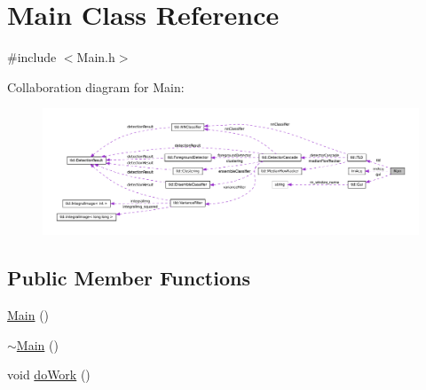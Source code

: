\hypertarget{class_main}{
\section{Main Class Reference}
\label{class_main}
}


{\ttfamily \#include $<$Main.h$>$}



Collaboration diagram for Main:
\nopagebreak
\begin{figure}[H]
\begin{center}
\leavevmode
\includegraphics[width=400pt]{class_main__coll__graph}
\end{center}
\end{figure}
\subsection*{Public Member Functions}
\begin{DoxyCompactItemize}
\item 
\hyperlink{class_main_a50d4361a1b613205467a441b5c40c199}{Main} ()
\item 
\hyperlink{class_main_a58d9c0798f0d2114e736d04d780a080f}{$\sim$Main} ()
\item 
void \hyperlink{class_main_a5effa58c6ae671f8ce4ff31cb6e07aa5}{doWork} ()
\end{DoxyCompactItemize}
